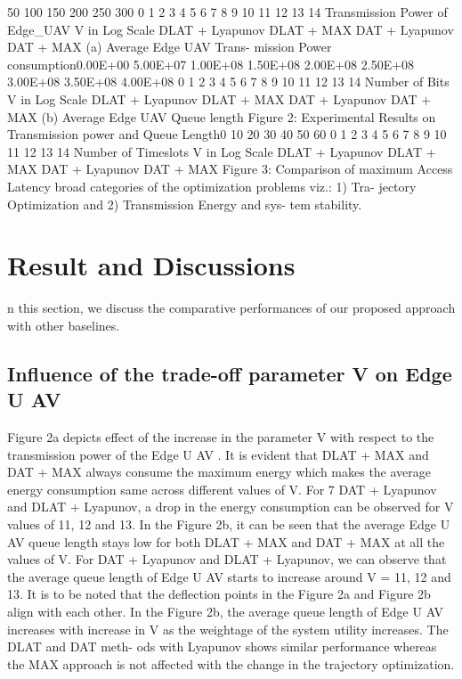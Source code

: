 \documentclass{article}
\begin{document}
\begin{multicols}{2}
50
100
150
200
250
300
0 1 2 3 4 5 6 7 8 9 10 11 12 13 14
Transmission Power of Edge_UAV
V in Log Scale
DLAT + Lyapunov DLAT + MAX DAT + Lyapunov DAT + MAX
(a) Average Edge UAV Trans-
mission Power consumption0.00E+00
5.00E+07
1.00E+08
1.50E+08
2.00E+08
2.50E+08
3.00E+08
3.50E+08
4.00E+08
0 1 2 3 4 5 6 7 8 9 10 11 12 13 14
Number of Bits
V in Log Scale
DLAT + Lyapunov DLAT + MAX DAT + Lyapunov DAT + MAX
(b) Average Edge UAV Queue
length
Figure 2: Experimental Results on Transmission power
and Queue Length0
10
20
30
40
50
60
0 1 2 3 4 5 6 7 8 9 10 11 12 13 14
Number of Timeslots
V in Log Scale
DLAT + Lyapunov DLAT + MAX DAT + Lyapunov DAT + MAX
Figure 3: Comparison of maximum Access Latency
broad categories of the optimization problems viz.: 1) Tra-
jectory Optimization and 2) Transmission Energy and sys-
tem stability.

\section{Result and Discussions}
n this section, we discuss the comparative performances
of our proposed approach with other baselines.
\subsection{Influence of the trade-off parameter V on
Edge U AV}Figure 2a depicts effect of the increase in the parameter V
with respect to the transmission power of the Edge U AV .
It is evident that DLAT + MAX and DAT + MAX always
consume the maximum energy which makes the average
energy consumption same across different values of V. For
7
DAT + Lyapunov and DLAT + Lyapunov, a drop in the
energy consumption can be observed for V values of 11,
12 and 13. In the Figure 2b, it can be seen that the
average Edge U AV queue length stays low for both DLAT
+ MAX and DAT + MAX at all the values of V. For DAT
+ Lyapunov and DLAT + Lyapunov, we can observe that
the average queue length of Edge U AV starts to increase
around V = 11, 12 and 13. It is to be noted that the
deflection points in the Figure 2a and Figure 2b align with
each other.
In the Figure 2b, the average queue length of
Edge U AV increases with increase in V as the weightage
of the system utility increases. The DLAT and DAT meth-
ods with Lyapunov shows similar performance whereas
the MAX approach is not affected with the change in the
trajectory optimization.

\end{multicols}
\end{document}
